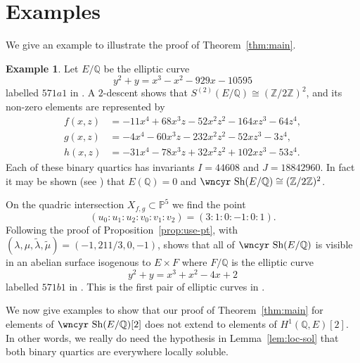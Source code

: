 \documentclass[12pt]{amsart}
\newcommand{\PP}{{\mathbb P}}
\newcommand{\Q}{{\mathbb Q}}
\newcommand{\Z}{{\mathbb Z}}
\newcommand{\isom}{\cong}
\newcommand{\Sha}{\mbox{\wncyr Sh}}
\theoremstyle{definition}
\newtheorem{Example}[Proposition]{Example}
\begin{document}
\section{Examples}
\label{sec:examples}

We give an example to illustrate the proof of Theorem~\ref{thm:main}.

\begin{Example} Let $E/\Q$ be the elliptic curve
\[  y^2 + y = x^3 - x^2 - 929 x - 10595 \]
labelled $571a1$ in \cite{CrTables}.
A $2$-descent shows that $S^{(2)}(E/\Q) \isom (\Z/2\Z)^2$, and its
non-zero elements are represented by
\begin{align*}
f(x,z) &= -11 x^4 + 68 x^3 z - 52 x^2 z^2 - 164 x z^3 - 64 z^4, \\
g(x,z) &= -4 x^4 - 60 x^3 z - 232 x^2 z^2 - 52 x z^3 - 3 z^4, \\
h(x,z) &= -31 x^4 - 78 x^3 z + 32 x^2 z^2 + 102 x z^3 - 53 z^4.
\end{align*}
Each of these binary quartics has invariants $I=44608$ and $J=18842960$.
In fact it may be shown (see \cite{GJPST}) that $E(\Q) = 0$ and
$\Sha(E/\Q) \isom (\Z/2\Z)^2$.

On the quadric intersection $X_{f,g} \subset \PP^5$ we find the point
\[ (u_0 : u_1 : u_2 : v_0 : v_1 : v_2) = (3 : 1 : 0 : -1 : 0 : 1). \]
Following the proof of Proposition~\ref{prop:use-pt}, with
$(\lambda,\mu,\widetilde{\lambda},\widetilde{\mu}) = (-1,211/3,0,-1)$,
shows that all of $\Sha(E/\Q)$ is visible
in an abelian surface isogenous to $E \times F$ where $F/\Q$ is
the elliptic curve
\[ y^2 + y = x^3 + x^2 - 4 x + 2 \]
labelled $571b1$ in \cite{CrTables}. This is the first pair of
elliptic curves in \cite[Table 2]{CM}.
\end{Example}

We now give examples to show that our proof of Theorem~\ref{thm:main}
for elements of $\Sha(E/\Q)[2]$ does not extend to elements of
$H^1(\Q,E)[2]$. In other words, we really do need the hypothesis in
Lemma~\ref{lem:loc-sol} that both binary quartics are everywhere
locally soluble.
\end{document}

